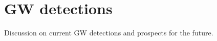 \documentclass[main.tex]{subfiles}
\begin{document}
\section{GW detections}


Discussion on current GW detections and prospects for the future. 
\end{document}
